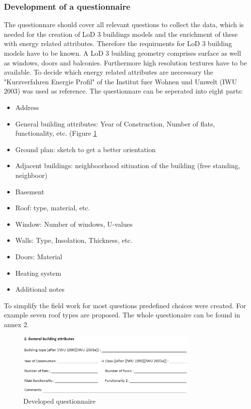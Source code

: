 \subsubsection{Development of a questionnaire}
The questionnare should cover all relevant questions to collect the data, which is needed for the creation of LoD 3 buildings models and the enrichment of these with energy related attributes. Therefore the requirments for LoD 3 building models have to be known. A LoD 3 building geometry comprises surface as well as windows, doors and balconies. Furthermore high resolution textures have to be available. To decide which energy related attributes are neccessary the "Kurzverfahren Energie Profil" of the Institut fuer Wohnen und Umwelt (IWU 2003) was used as reference. The questionnare can be seperated into eight parts:
\begin{itemize}
\item Address
\item General building attributes: Year of Construction, Number of flats, functionality, etc. (Figure \ref{fig:questionnaire}
\item Ground plan: sketch to get a better orientation
\item Adjacent buildings: neighboorhood sitiuation of the building (free standing, neighboor)
\item Basement
\item Roof: type, material, etc.
\item Window: Number of windows, U-values
\item Walls: Type, Insolation, Thickness, etc.
\item Doors: Material
\item Heating system
\item Additional notes
\end{itemize}

To simplify the field work for most questions predefined choices were created. For example seven roof types are proposed. The whole questionaire can be found in annex 2.

\begin{figure}[ht]
	\centering
	\includegraphics[width=0.8\textwidth]{phase1/group2/figures/questionnaire.png}
	\caption{Developed questionnaire}
	\label{fig:questionnaire}
\end{figure}


